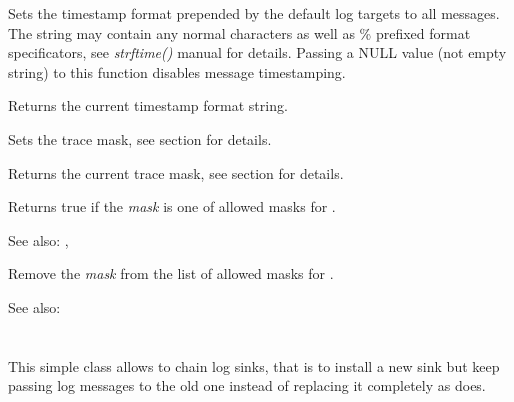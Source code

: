 Sets the timestamp format prepended by the default log targets to all
messages. The string may contain any normal characters as well as \%
prefixed format specificators, see {\it strftime()} manual for details.
Passing a NULL value (not empty string) to this function disables message timestamping.

\label{wxloggettimestamp}


Returns the current timestamp format string.

\label{wxlogsettracemask}


Sets the trace mask, see 
section for details.

\label{wxloggettracemask}

Returns the current trace mask, see  section
for details.

\label{wxlogisallowedtracemask}


Returns true if the {\it mask} is one of allowed masks for
.

See also: ,

\label{wxlogremovetracemask}


Remove the {\it mask} from the list of allowed masks for
.

See also: 


\section{}\label{wxlogchain}

This simple class allows to chain log sinks, that is to install a new sink but
keep passing log messages to the old one instead of replacing it completely as
 does.

